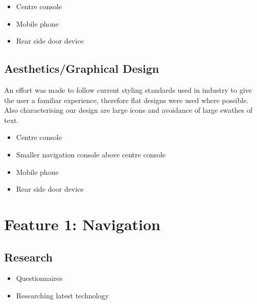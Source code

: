 \documentclass{article}
\begin{document}
\begin{itemize}
    \begin{itemize}
      \item Centre console
      \item Mobile phone
      \item Rear side door device
    \end{itemize}
\subsection{Aesthetics/Graphical Design} \label{ssec:aesthetics}
An effort was made to follow current styling standards used in industry to give the user a familiar experience, therefore flat designs were used where possible. Also characterising our design are large icons and avoidance of large swathes of text.  
    
    \begin{itemize}
		\item Centre console
        \item Smaller navigation console above centre console
        \item Mobile phone
        \item Rear side door device
	\end{itemize}
    
\section{Feature 1: Navigation} \label{sec:navigation}

\subsection{Research} \label{ssec:research}
  \begin{itemize}
    \item Questionnaires
    \item Researching latest technology
  \end{itemize}
  

\end{itemize}
\end{document}
